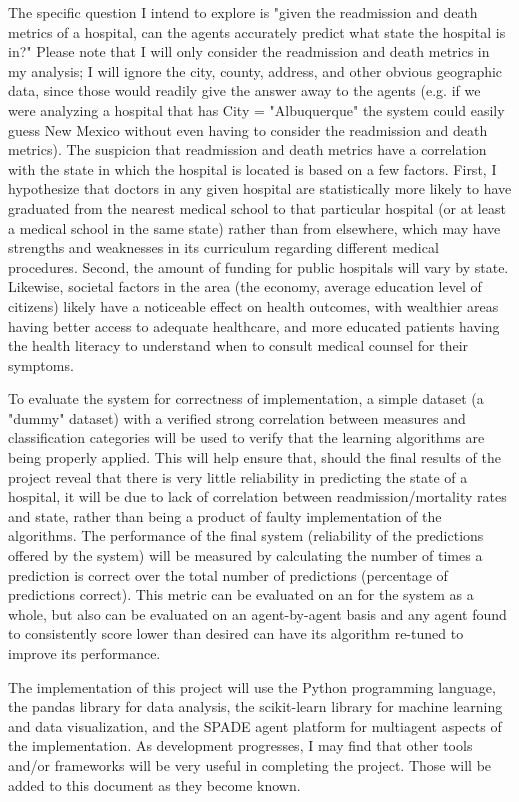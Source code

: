 \documentclass[a4paper,12pt]{article}
\begin{document}
The specific question I intend to explore is "given the readmission and death metrics of a hospital, can the agents accurately predict what state the hospital is in?" Please note that I will only consider the readmission and death metrics in my analysis; I will ignore the city, county, address, and other obvious geographic data, since those would readily give the answer away to the agents (e.g. if we were analyzing a hospital that has City = "Albuquerque" the system could easily guess New Mexico without even having to consider the readmission and death metrics). The suspicion that readmission and death metrics have a correlation with the state in which the hospital is located is based on a few factors. First, I hypothesize that doctors in any given hospital are statistically more likely to have graduated from the nearest medical school to that particular hospital (or at least a medical school in the same state) rather than from elsewhere, which may have strengths and weaknesses in its curriculum regarding different medical procedures. Second, the amount of funding for public hospitals will vary by state. Likewise, societal factors in the area (the economy, average education level of citizens) likely have a noticeable effect on health outcomes, with wealthier areas having better access to adequate healthcare, and more educated patients having the health literacy to understand when to consult medical counsel for their symptoms. 
\par
To evaluate the system for correctness of implementation, a simple dataset (a "dummy" dataset) with a verified strong correlation between measures and classification categories will be used to verify that the learning algorithms are being properly applied. This will help ensure that, should the final results of the project reveal that there is very little reliability in predicting the state of a hospital, it will be due to lack of correlation between readmission/mortality rates and state, rather than being a product of faulty implementation of the algorithms. The performance of the final system (reliability of the predictions offered by the system) will be measured by calculating the number of times a prediction is correct over the total number of predictions (percentage of predictions correct). This metric can be evaluated on an for the system as a whole, but also can be evaluated on an agent-by-agent basis and any agent found to consistently score lower than desired can have its algorithm re-tuned to improve its performance.
\par
The implementation of this project will use the Python programming language, the pandas library for data analysis, the scikit-learn library for machine learning and data visualization, and the SPADE agent platform for multiagent aspects of the implementation. As development progresses, I may find that other tools and/or frameworks will be very useful in completing the project. Those will be added to this document as they become known.
\end{document}
